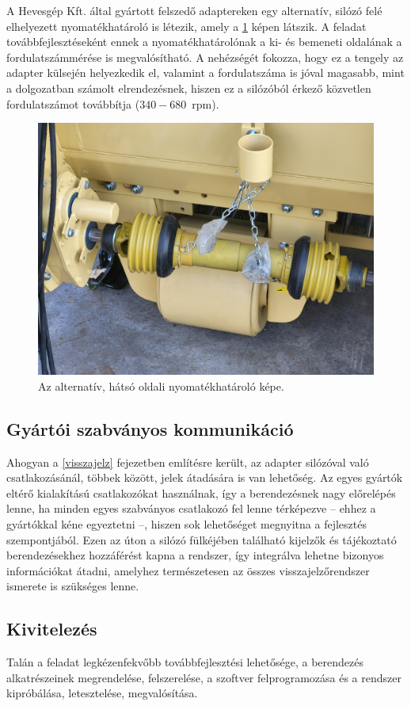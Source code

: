 A Hevesgép Kft. által gyártott felszedő adaptereken egy alternatív, silózó felé elhelyezett nyomatékhatároló is létezik, amely a \ref{hatso_nyomhat} képen látszik. A feladat továbbfejlesztéseként ennek a nyomatékhatárolónak a ki- és bemeneti oldalának a fordulatszámmérése is megvalósítható. A nehézségét fokozza, hogy ez a tengely az adapter külsején helyezkedik el, valamint a fordulatszáma is jóval magasabb, mint a dolgozatban számolt elrendezésnek, hiszen ez a silózóból érkező közvetlen fordulatszámot továbbítja ($340 - 680$~rpm).
\begin{figure}
	\centering
	\includegraphics[width=\columnwidth*7/10]{figures/hatso_nyomatekhatarolo.jpg}
	\caption{Az alternatív, hátsó oldali nyomatékhatároló képe.}
	\label{hatso_nyomhat}
\end{figure}

\subsection{Gyártói szabványos kommunikáció}

Ahogyan a \ref{visszajelz} fejezetben említésre került, az adapter silózóval való csatlakozásánál, többek között, jelek átadására is van lehetőség. Az egyes gyártók eltérő kialakítású csatlakozókat használnak, így a berendezésnek nagy előrelépés lenne, ha minden egyes szabványos csatlakozó fel lenne térképezve -- ehhez a gyártókkal kéne egyeztetni --, hiszen sok lehetőséget megnyitna a fejlesztés szempontjából. Ezen az úton a silózó fülkéjében található kijelzők és tájékoztató berendezésekhez hozzáférést kapna a rendszer, így integrálva lehetne bizonyos információkat átadni, amelyhez természetesen az összes visszajelzőrendszer ismerete is szükséges lenne.

\subsection{Kivitelezés}

Talán a feladat legkézenfekvőbb továbbfejlesztési lehetősége, a berendezés alkatrészeinek megrendelése, felszerelése, a szoftver felprogramozása és a rendszer kipróbálása, letesztelése, megvalósítása.
